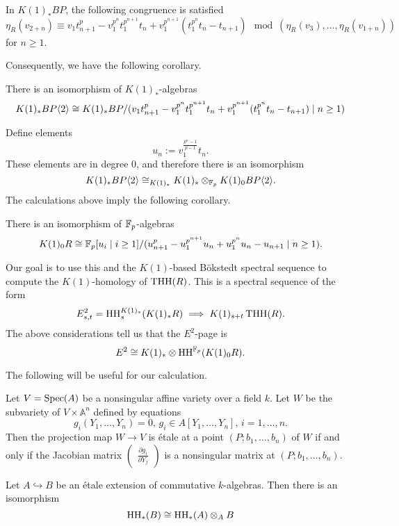 \begin{lem}
	In $K(1)_*BP$, the following congruence is satisfied
	\[
	\eta_R(v_{2+n})\equiv v_1t_{n+1}^p-v_1^{p^n}t_1^{p^{n+1}}t_n+v_1^{p^{n+1}}(t_1^{p^n}t_n-t_{n+1})  \mod(\eta_R(v_3), \ldots, \eta_R(v_{1+n}))
	\]
	for $n\geq 1$.
\end{lem}

Consequently, we have the following corollary. 

\begin{cor}
	There is an isomorphism of $K(1)_*$-algebras
	\[
	K(1)_*BP\langle 2 \rangle\cong K(1)_*BP/(v_1t_{n+1}^p-v_1^{p^n}t_1^{p^{n+1}}t_n+v_1^{p^{n+1}}(t_1^{p^n}t_n-t_{n+1}) \mid n\geq 1)
	\]
\end{cor}

Define elements
\[ u_n:=v_1^{\frac{p^n-1}{p-1}}t_n.\] 
These elements are in degree 0, and therefore there is an isomorphism
\[
K(1)_*BP\langle 2 \rangle\cong_{K(1)_*}K(1)_*\otimes_{\mathbb{F}_p}K(1)_0BP\langle 2 \rangle.
\]
The calculations above imply the following corollary.

\begin{cor}
	There is an isomorphism of $\mathbb{F}_p$-algebras
	\[
	K(1)_0 R\cong\mathbb{F}_p[u_i\mid i\geq 1]/(u_{n+1}^p-u_1^{p^{n+1}}u_n+u_1^{p^n}u_n-u_{n+1}\mid n\geq 1).
	\]
\end{cor}

Our goal is to use this and the $K(1)$-based B\"okstedt spectral sequence to compute the $K(1)$-homology of $\operatorname{THH}(R)$. This is a spectral sequence of the form 
\[
E^2_{s,t}= \operatorname{HH}^{K(1)_*}_s(K(1)_*R)\implies K(1)_{s+t}\operatorname{THH}(R).
\]
The above considerations tell us that the $E^2$-page is 
\[
E^2\cong K(1)_*\otimes \operatorname{HH}^{\mathbb{F}_p}(K(1)_0R). 
\]

The following will be useful for our calculation.

\begin{lem}\label{lem:etale}
	Let $V = \operatorname{Spec}(A)$ be a nonsingular affine variety over a field $k$. Let $W$ be the subvariety of $V\times \mathbb{A}^n$ defined by equations
	\[
	g_i(Y_1, \ldots, Y_n)=0, \, g_i\in A[Y_1, \ldots, Y_n],\, i=1,\ldots , n.
	\]
	Then the projection map $W\to V$ is \'etale at a point $(P;b_1, \ldots, b_n)$ of $W$ if and only if the Jacobian matrix $\begin{pmatrix}
		\frac{\partial g_i}{\partial Y_j}
	\end{pmatrix}$ is a nonsingular matrix at $(P; b_1, \ldots , b_n)$.
\end{lem} 

\begin{thm}\label{etaledescent}
	Let $A\hookrightarrow B$ be an \'etale extension of commutative $k$-algebras. Then there is an isomorphism
	\[
	\operatorname{HH}_*(B)\cong \operatorname{HH}_*(A)\otimes_A B
	\]
\end{thm}

